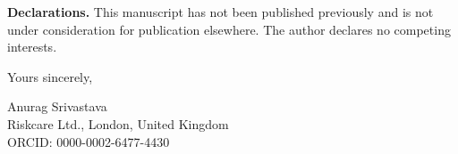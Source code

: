 \documentclass[12pt,a4paper]{article}
\begin{document}
\textbf{Declarations.} This manuscript has not been published previously and
is not under consideration for publication elsewhere. The author declares no
competing interests.

\vspace{0.6cm}

\noindent Yours sincerely,

\vspace{0.8cm}

\noindent Anurag Srivastava\\
Riskcare Ltd., London, United Kingdom\\
ORCID: 0000-0002-6477-4430
\end{document}
